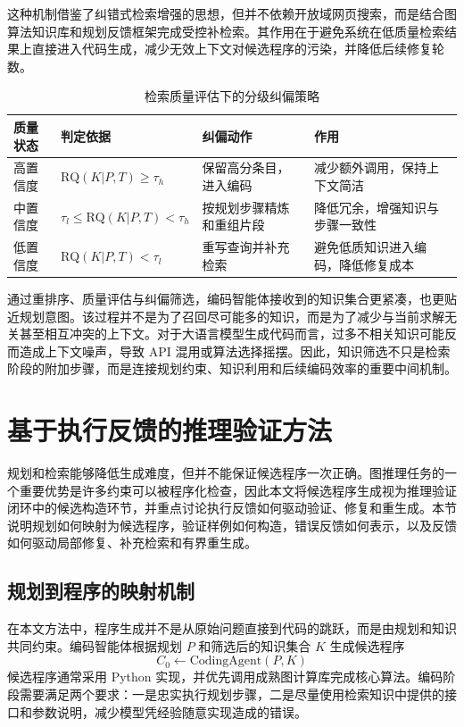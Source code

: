 这种机制借鉴了纠错式检索增强的思想，但并不依赖开放域网页搜索，而是结合图算法知识库和规划反馈框架完成受控补检索。其作用在于避免系统在低质量检索结果上直接进入代码生成，减少无效上下文对候选程序的污染，并降低后续修复轮数。

\begin{table}[htbp]
\centering
\small
\caption{检索质量评估下的分级纠偏策略}
\label{tab:retrieval_correction}
\renewcommand{\arraystretch}{1.15}
\begin{tabularx}{\textwidth}{
>{\centering\arraybackslash}p{2.0cm}
>{\raggedright\arraybackslash}p{3.1cm}
>{\raggedright\arraybackslash}X
>{\raggedright\arraybackslash}X}
\toprule
质量状态 & 判定依据 & 纠偏动作 & 作用 \\
\midrule
高置信度 &
$\mathrm{RQ}(K|P,T)\ge \tau_h$ &
保留高分条目，进入编码 &
减少额外调用，保持上下文简洁 \\
中置信度 &
$\tau_l \le \mathrm{RQ}(K|P,T)<\tau_h$ &
按规划步骤精炼和重组片段 &
降低冗余，增强知识与步骤一致性 \\
低置信度 &
$\mathrm{RQ}(K|P,T)<\tau_l$ &
重写查询并补充检索 &
避免低质知识进入编码，降低修复成本 \\
\bottomrule
\end{tabularx}
\end{table}

通过重排序、质量评估与纠偏筛选，编码智能体接收到的知识集合更紧凑，也更贴近规划意图。该过程并不是为了召回尽可能多的知识，而是为了减少与当前求解无关甚至相互冲突的上下文。对于大语言模型生成代码而言，过多不相关知识可能反而造成上下文噪声，导致 API 混用或算法选择摇摆。因此，知识筛选不只是检索阶段的附加步骤，而是连接规划约束、知识利用和后续编码效率的重要中间机制。

\section{基于执行反馈的推理验证方法}

规划和检索能够降低生成难度，但并不能保证候选程序一次正确。图推理任务的一个重要优势是许多约束可以被程序化检查，因此本文将候选程序生成视为推理验证闭环中的候选构造环节，并重点讨论执行反馈如何驱动验证、修复和重生成。本节说明规划如何映射为候选程序，验证样例如何构造，错误反馈如何表示，以及反馈如何驱动局部修复、补充检索和有界重生成。

\subsection{规划到程序的映射机制}

在本文方法中，程序生成并不是从原始问题直接到代码的跳跃，而是由规划和知识共同约束。编码智能体根据规划 $P$ 和筛选后的知识集合 $K$ 生成候选程序
\begin{equation}
C_0 \leftarrow \mathrm{CodingAgent}(P,K)
\end{equation}
候选程序通常采用 Python 实现，并优先调用成熟图计算库完成核心算法。编码阶段需要满足两个要求：一是忠实执行规划步骤，二是尽量使用检索知识中提供的接口和参数说明，减少模型凭经验随意实现造成的错误。

